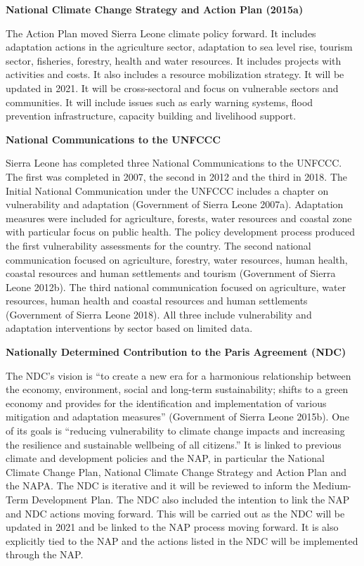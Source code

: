 \documentclass[
]{book}
\begin{document}
\textbf{National Climate Change Strategy and Action Plan (2015a)}

The Action Plan moved Sierra Leone climate policy forward. It includes adaptation actions in the agriculture sector, adaptation to sea level rise, tourism sector, fisheries, forestry, health and water resources. It includes projects with activities and costs. It also includes a resource mobilization strategy. It will be updated in 2021. It will be cross-sectoral and focus on vulnerable sectors and communities. It will include issues such as early warning systems, flood prevention infrastructure, capacity building and livelihood support.

\textbf{National Communications to the UNFCCC}

Sierra Leone has completed three National Communications to the UNFCCC. The first was completed in 2007, the second in 2012 and the third in 2018. The Initial National Communication under the UNFCCC includes a chapter on vulnerability and adaptation (Government of Sierra Leone 2007a). Adaptation measures were included for agriculture, forests, water resources and coastal zone with particular focus on public health. The policy development process produced the first vulnerability assessments for the country. The second national communication focused on agriculture, forestry, water resources, human health, coastal resources and human settlements and tourism (Government of Sierra Leone 2012b). The third national communication focused on agriculture, water resources, human health and coastal resources and human settlements (Government of Sierra Leone 2018). All three include vulnerability and adaptation interventions by sector based on limited data.

\textbf{Nationally Determined Contribution to the Paris Agreement (NDC)}

The NDC's vision is ``to create a new era for a harmonious relationship between the economy, environment, social and long-term sustainability; shifts to a green economy and provides for the identification and implementation of various mitigation and adaptation measures'' (Government of Sierra Leone 2015b). One of its goals is ``reducing vulnerability to climate change impacts and increasing the resilience and sustainable wellbeing of all citizens.'' It is linked to previous climate and development policies and the NAP, in particular the National Climate Change Plan, National Climate Change Strategy and Action Plan and the NAPA. The NDC is iterative and it will be reviewed to inform the Medium-Term Development Plan. The NDC also included the intention to link the NAP and NDC actions moving forward. This will be carried out as the NDC will be updated in 2021 and be linked to the NAP process moving forward. It is also explicitly tied to the NAP and the actions listed in the NDC will be implemented through the NAP.
\end{document}
